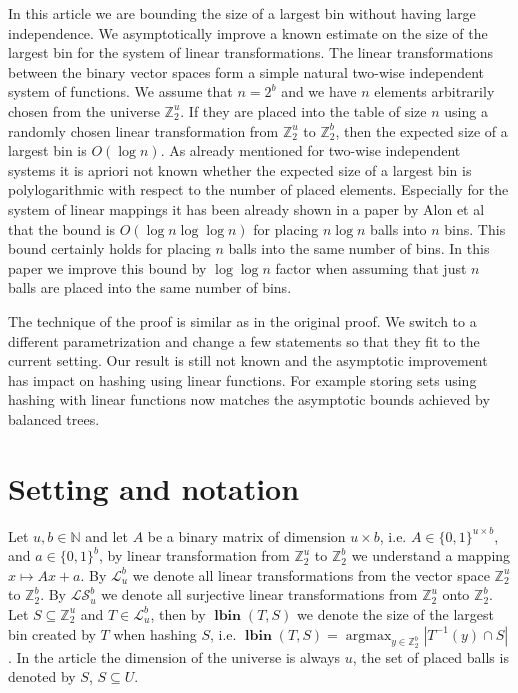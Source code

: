 \documentclass{article}
\newcommand{\lbin}[2]{\operatorname{\mathbf{lbin}}({#1}, {#2})}
\newcommand{\vecspace}[2]{\mathbb{Z}_{#1}^{#2}}
\newcommand{\binvecspace}[1]{\vecspace{2}{#1}}
\newcommand{\linearmaps}[2]{\mathcal{L}_{#1}^{#2}}
\newcommand{\surjectivelinearmaps}[2]{\mathcal{LS}_{#1}^{#2}}
\begin{document}
In this article we are bounding the size of a largest bin without having large independence.
We asymptotically improve a known estimate on the size of the largest bin for the system of linear transformations.
The linear transformations between the binary vector spaces form a simple natural two-wise independent system of functions.
We assume that $n = 2^b$ and we have $n$ elements arbitrarily chosen from the universe $\binvecspace{u}$.
If they are placed into the table of size $n$ using a randomly chosen linear transformation from $\binvecspace{u}$ to $\binvecspace{b}$, then the expected size of a largest bin is $O(\log n)$.
As already mentioned for two-wise independent systems it is apriori not known whether the expected size of a largest bin is polylogarithmic with respect to the number of placed elements.
Especially for the system of linear mappings it has been already shown in a paper by Alon et al \cite{alonetal} that the bound is $O(\log n \log \log n)$ for placing $n \log n$ balls into $n$ bins.
This bound certainly holds for placing $n$ balls into the same number of bins.
In this paper we improve this bound by $\log \log n$ factor when assuming that just $n$ balls are placed into the same number of bins.

The technique of the proof is similar as in the original proof. We switch to a different parametrization and change a few statements so that they fit to the current setting.
Our result is still not known and the asymptotic improvement has impact on hashing using linear functions.
For example storing sets using hashing with linear functions now matches the asymptotic bounds achieved by balanced trees.

\section{Setting and notation}
Let $u, b \in \mathbb{N}$ and let $A$ be a binary matrix of dimension $u \times b$, i.e. $A \in \{0, 1\}^{u \times b}$, and $a \in \{0, 1\}^b$, by linear transformation from $\binvecspace{u}$ to $\binvecspace{b}$ we understand a mapping $x \mapsto Ax + a$.
By $\linearmaps{u}{b}$ we denote all linear transformations from the vector space $\binvecspace{u}$ to $\binvecspace{b}$.
By $\surjectivelinearmaps{u}{b}$ we denote all surjective linear transformations from $\binvecspace{u}$ onto $\binvecspace{b}$.
Let $S \subseteq \binvecspace{u}$ and $T \in \linearmaps{u}{b}$, then by $\lbin{T}{S}$ we denote the size of the largest bin created by $T$ when hashing $S$, i.e. $\lbin{T}{S} = \operatorname{argmax}_{y \in \binvecspace{b}} |T^{-1}(y) \cap S|$.
In the article the dimension of the universe is always $u$, the set of placed balls is denoted by $S$, $S \subseteq U$.
\end{document}
